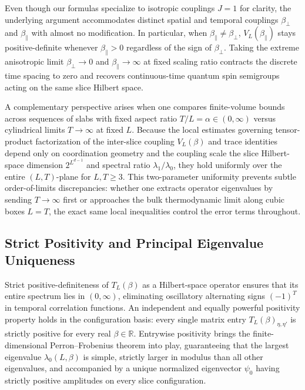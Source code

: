 \documentclass[11pt]{article}
\theoremstyle{definition}
\begin{document}
Even though our formulas specialize to isotropic couplings $J = 1$ for clarity, the
underlying argument accommodates distinct spatial and temporal couplings
$\beta_\perp$ and $\beta_\parallel$ with almost no modification. In particular, when
$\beta_\parallel \neq \beta_\perp$, $V_L(\beta_\parallel)$ stays positive-definite
whenever $\beta_\parallel > 0$ regardless of the sign of $\beta_\perp$. Taking the
extreme anisotropic limit $\beta_\perp \to 0$ and $\beta_\parallel \to \infty$ at
fixed scaling ratio contracts the discrete time spacing to zero and recovers
continuous-time quantum spin semigroups acting on the same slice Hilbert space.

A complementary perspective arises when one compares finite-volume bounds across
sequences of slabs with fixed aspect ratio $T / L = \alpha \in (0, \infty)$ versus
cylindrical limits $T \to \infty$ at fixed $L$. Because the local estimates
governing tensor-product factorization of the inter-slice coupling $V_L(\beta)$ and
trace identities depend only on coordination geometry and the coupling scale the
slice Hilbert-space dimension $2^{L^{d-1}}$ and spectral ratio
$\lambda_1/\lambda_0$, they hold uniformly over the entire $(L, T)$-plane for $L, T
\ge 3$. This two-parameter uniformity prevents subtle order-of-limits discrepancies:
whether one extracts operator eigenvalues by sending $T \to \infty$ first or
approaches the bulk thermodynamic limit along cubic boxes $L = T$, the exact same
local inequalities control the error terms throughout.

\subsection{Strict Positivity and Principal Eigenvalue Uniqueness}
\label{subsec:s05b}

Strict positive-definiteness of $T_L(\beta)$ as a Hilbert-space operator ensures
that its entire spectrum lies in $(0, \infty)$, eliminating oscillatory alternating
signs $(-1)^T$ in temporal correlation functions. An independent and equally
powerful positivity property holds in the configuration basis: every single matrix
entry $T_L(\beta)_{\eta, \eta'}$ is strictly positive for every real $\beta \in
\mathbb{R}$. Entrywise positivity brings the finite-dimensional Perron--Frobenius
theorem into play, guaranteeing that the largest eigenvalue $\lambda_0(L, \beta)$ is
simple, strictly larger in modulus than all other eigenvalues, and accompanied by a
unique normalized eigenvector $\psi_0$ having strictly positive amplitudes on every
slice configuration.
\end{document}
